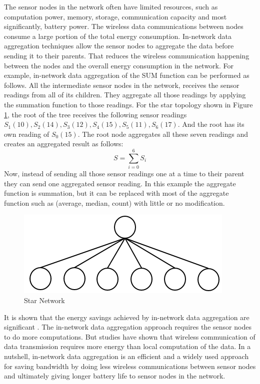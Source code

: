 	The sensor nodes in the network often have limited resources, such as computation power, memory, storage, communication capacity and most significantly, battery power.
	The wireless data communications between nodes consume a large portion of the total energy consumption. 
	In-network data aggregation techniques allow the sensor nodes to aggregate the data before sending it to their parents.
	That reduces the wireless communication happening between the nodes and the overall energy consumption in the network. 	
	For example, in-network data aggregation of the SUM function can be performed as follows.
	All the intermediate sensor nodes in the network, receives the sensor readings from all of its children.
	They aggregate all those readings by applying the summation function to those readings.
	For the star topology shown in Figure \ref{fig:star-network}, the root of the tree receives the following sensor readings $S_{1}(10),S_{2}(14),S_{3}(12),S_{4}(15),S_{5}(11),S_{6}(17)$. And the root has its own reading of $S_{0}(15)$. 
	The root node aggregates all these seven readings and creates an aggregated result as follows:
	\begin{equation}
		S = \sum_{i=0}^6 S_{i}
	\end{equation}
	Now, instead of sending all those sensor readings one at a time to their parent they can send one aggregated sensor reading.
	In this example the aggregate function is summation, but it can be replaced with most of the aggregate function such as (average, median, count) with little or no modification.
	\begin{figure}[h!]
		\centering
		\includegraphics[scale = 1]{images/star-tree.png}
		\caption{Star Network}
		\label{fig:star-network}
	\end{figure}

	It is shown that the energy savings achieved by in-network data aggregation are significant \cite{madden2002tag}.
	The in-network data aggregation approach requires the sensor nodes to do more computations.
	But studies have shown that wireless communication of data transmission requires more energy than local computation of the data. 
	In a nutshell, in-network data aggregation is an efficient and a widely used approach for saving bandwidth by doing less wireless communications between sensor nodes and ultimately giving longer battery life to sensor nodes in the network.

